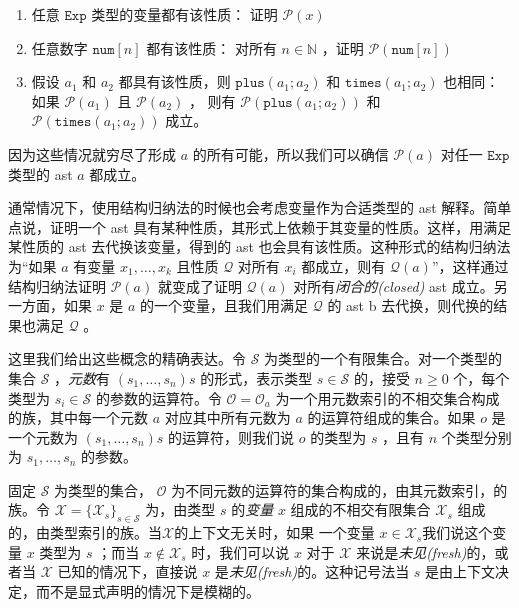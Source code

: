 \begin{enumerate}
\def\labelenumi{\arabic{enumi}.}
\item
  任意 \(\texttt{Exp}\) 类型的变量都有该性质： 证明 \(\mathcal{P}(x)\)
\item
  任意数字 \(\texttt{num}[n]\) 都有该性质： 对所有 \(n \in \mathbb{N}\)
  ，证明 \(\mathcal{P}(\texttt{num}[n])\)
\item
  假设 \(a_1\) 和 \(a_2\) 都具有该性质，则 \(\texttt{plus}(a_1;a_2)\) 和
  \(\texttt{times}(a_1;a_2)\) 也相同：如果 \(\mathcal{P}(a_1)\) 且
  \(\mathcal{P}(a_2)\) ， 则有 \(\mathcal{P}(\texttt{plus}(a_1;a_2))\)
  和 \(\mathcal{P}(\texttt{times}(a_1;a_2))\) 成立。
\end{enumerate}

因为这些情况就穷尽了形成 \(a\) 的所有可能，所以我们可以确信
\(\mathcal{P}(a)\) 对任一 \(\texttt{Exp}\) 类型的 ast \(a\) 都成立。

通常情况下，使用结构归纳法的时候也会考虑变量作为合适类型的 ast
解释。简单点说，证明一个 ast
具有某种性质，其形式上依赖于其变量的性质。这样，用满足某性质的 ast
去代换该变量，得到的 ast 也会具有该性质。这种形式的结构归纳法为``如果
\(a\) 有变量 \(x_1,\ldots,x_k\) 且性质 \(\mathcal{Q}\) 对所有 \(x_i\)
都成立，则有 \(\mathcal{Q}(a)\)''，这样通过结构归纳法证明
\(\mathcal{P}(a)\) 就变成了证明 \(\mathcal{Q}(a)\)
对所有\emph{闭合的(closed)} ast 成立。另一方面，如果 \(x\) 是 \(a\)
的一个变量，且我们用满足 \(\mathcal{Q}\) 的 ast b
去代换，则代换的结果也满足 \(\mathcal{Q}\) 。

这里我们给出这些概念的精确表达。令 \(\mathcal{S}\)
为类型的一个有限集合。对一个类型的集合 \(\mathcal{S}\) ，\emph{元数}有
\((s_1,\ldots ,s_n)s\) 的形式，表示类型 \(s\in \mathcal{S}\) 的，接受
\(n\ge 0\) 个，每个类型为 \(s_i \in \mathcal{S}\) 的参数的运算符。令
\(\mathcal{O} = {\mathcal {O}_a}\)
为一个用元数索引的不相交集合构成的族，其中每一个元数 \(a\)
对应其中所有元数为 \(a\) 的运算符组成的集合。如果 \(o\) 是一个元数为
\((s_1,\ldots,s_n)s\) 的运算符，则我们说 \(o\) 的类型为 \(s\) ，且有
\(n\) 个类型分别为 \(s_1,\ldots,s_n\) 的参数。

固定 \(\mathcal{S}\) 为类型的集合， \(\mathcal{O}\)
为不同元数的运算符的集合构成的，由其元数索引，的族。令
\(\mathcal{X} = \{\mathcal{X}_s\}_{s \in \mathcal{S}}\) 为，由类型 \(s\)
的\emph{变量} \(x\) 组成的不相交有限集合 \(\mathcal{X}_s\)
组成的，由类型索引的族。当\(\mathcal{X}\)的上下文无关时，如果 一个变量
\(x\in \mathcal{X}_s\)我们说这个变量 \(x\) 类型为 \(s\) ；而当
\(x \notin \mathcal{X}_s\) 时，我们可以说 \(x\) 对于 \(\mathcal{X}\)
来说是\emph{未见(fresh)}的，或者当 \(\mathcal{X}\) 已知的情况下，直接说
\(x\) 是\emph{未见(fresh)}的。这种记号法当 \(s\)
是由上下文决定，而不是显式声明的情况下是模糊的。

